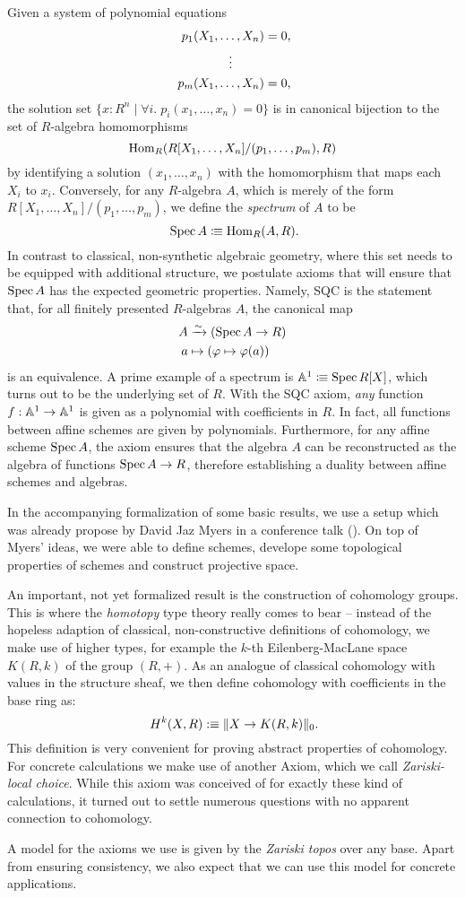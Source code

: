 \documentclass{../util/zariski}
\begin{document}
Given a system of polynomial equations
\begin{align*}
  p_1(X_1, \dots, X_n) &= 0\rlap{,} \\
  \vdots\quad\quad\;\;   \\
  p_m(X_1, \dots, X_n) &= 0\rlap{,}
\end{align*}
the solution set
$\{ x : R^n \mid \forall i.\; p_i(x_1, \dots, x_n) = 0 \}$
is in canonical bijection to the set of $R$-algebra homomorphisms
\[ \mathrm{Hom}_R(R[X_1, \dots, X_n]/(p_1, \dots, p_m), R) \]
by identifying a solution $(x_1,\dots,x_n)$ with the homomorphism that maps each $X_i$ to $x_i$.
Conversely, for any $R$-algebra $A$, which is merely of the form $R[X_1, \dots, X_n]/(p_1, \dots, p_m)$,
we define the \emph{spectrum} of $A$ to be
\[
  \Spec A \colonequiv \Hom_R(A, R)
  \rlap{.}
\]
In contrast to classical, non-synthetic algebraic geometry,
where this set needs to be equipped with additional structure,
we postulate axioms that will ensure that $\operatorname{Spec} A$ has the expected geometric properties.
Namely, SQC is the statement that, for all finitely presented $R$-algebras $A$, the canonical map
  \begin{align*}
    A&\xrightarrow{\sim} (\operatorname{Spec} A\to R) \\
    a&\mapsto (\varphi\mapsto \varphi(a))
  \end{align*}
is an equivalence.
A prime example of a spectrum is $\mathbb{A}^1\vcentcolon\mspace{-1.2mu}\equiv \operatorname{Spec} R[X]$,
which turns out to be the underlying set of $R$.
With the SQC axiom,
\emph{any} function $f:\mathbb{A}^1\to \mathbb{A}^1$ is given as a polynomial with coefficients in $R$.
In fact, all functions between affine schemes are given by polynomials.
Furthermore, for any affine scheme $\operatorname{Spec} A$,
the axiom ensures that
the algebra $A$ can be reconstructed as the algebra of functions $\operatorname{Spec} A \to R$,
therefore establishing a duality between affine schemes and algebras.

In the accompanying formalization \cite{formalization} of some basic results,
we use a setup which was already propose by David Jaz Myers
in a conference talk (\cite{myers-talk1, myers-talk2}).
On top of Myers' ideas,
we were able to define schemes, develope some topological properties of schemes
and construct projective space.

An important, not yet formalized result
is the construction of cohomology groups.
This is where the \emph{homotopy} type theory really comes to bear --
instead of the hopeless adaption of classical, non-constructive definitions of cohomology,
we make use of higher types,
for example the $k$-th Eilenberg-MacLane space $K(R,k)$ of the group $(R,+)$.
As an analogue of classical cohomology with values in the structure sheaf,
we then define cohomology with coefficients in the base ring as:
\[
  H^k(X,R):\equiv \|X\to K(R,k)\|_0
  \rlap{.}
\]
This definition is very convenient for proving abstract properties of cohomology.
For concrete calculations we make use of another Axiom,
which we call \emph{Zariski-local choice}.
While this axiom was conceived of for exactly these kind of calculations,
it turned out to settle numerous questions with no apparent connection to cohomology.

A model for the axioms we use is given by the \emph{Zariski topos} over any base.
Apart from ensuring consistency,
we also expect that we can use this model for concrete applications.


\printbibliography
\end{document}
